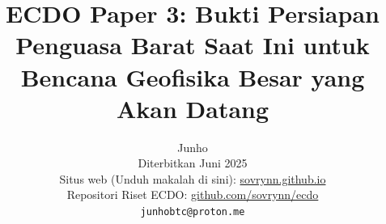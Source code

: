 \documentclass[10pt,twocolumn,letterpaper]{article}
\begin{document}
\title{ECDO Paper 3: Bukti Persiapan Penguasa Barat Saat Ini untuk Bencana Geofisika Besar yang Akan Datang}

\author{Junho\\
Diterbitkan Juni 2025\\
Situs web (Unduh makalah di sini): \href{https://sovrynn.github.io}{sovrynn.github.io}\\
Repositori Riset ECDO: \href{https://github.com/sovrynn/ecdo}{github.com/sovrynn/ecdo}\\
{\tt\small junhobtc@proton.me}
}

\maketitle
\end{document}
